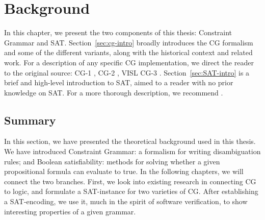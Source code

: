 \chapter{Background}

In this chapter, we present the two components of this thesis: Constraint Grammar and SAT.
Section~\ref{sec:cg-intro} broadly introduces the CG formalism and some of the different variants, along with the historical context and related work.
For a description of any specific CG implementation, we direct the reader to the original source: CG-1 \cite{karlsson1990cgp,karlsson1995constraint}, CG-2 \cite{tapanainen1996}, VISL CG-3 \cite{bick2015,vislcg3}.
Section~\ref{sec:SAT-intro} is a brief and high-level introduction to SAT, aimed to a reader with no prior knowledge on SAT. For a more thorough description, we recommend .






\section{Summary}

In this section, we have presented the theoretical background used in this thesis. 
We have introduced Constraint Grammar: a formalism for writing disambiguation rules; and Boolean satisfiability: methods for solving whether a given propositional formula can evaluate to true.
In the following chapters, we will connect the two branches. First, we look into existing research in connecting CG to logic, and formulate a SAT-instance for two varieties of CG. After establishing a SAT-encoding, we use it, much in the spirit of software verification, to show interesting properties of a given grammar. 



 






